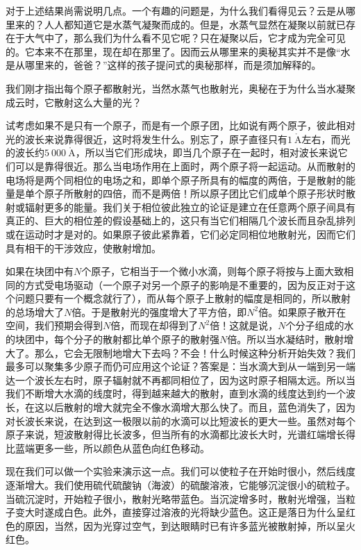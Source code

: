对于上述结果尚需说明几点。一个有趣的问题是，为什么我们看得见云？云是从哪里来的？人人都知道它是水蒸气凝聚而成的。但是，水蒸气显然在凝聚以前就已存在于大气中了，那么我们为什么看不见它呢？只在凝聚以后，它才成为完全可见的。它本来不在那里，现在却在那里了。因而云从哪里来的奥秘其实并不是像“水是从哪里来的，爸爸？”这样的孩子提问式的奥秘那样，而是须加解释的。

我们刚才指出每个原子都散射光，当然水蒸气也散射光，奥秘在于为什么当水凝聚成云时，它散射这么大量的光？

试考虑如果不是只有一个原子，而是有一个原子团，比如说有两个原子，彼此相对光的波长来说靠得很近，这时将发生什么。别忘了，原子直径只有$1~\mathring{\text{A}}$左右，而光的波长约$5~000~\mathring{\text{A}}$，所以当它们形成块，即当几个原子在一起时，相对波长来说它们可以是靠得很近。那么当电场作用在上面时，两个原子将一起运动。从而散射的电场将是两个同相位的电场之和，即单个原子所具有的幅度的两倍，于是散射的能量是单个原子所散射的四倍，而不是两倍！所以原子团比它们成单个原子形状时散射或辐射更多的能量。我们关于相位彼此独立的论证是建立在任意两个原子间具有真正的、巨大的相位差的假设基础上的，这只有当它们相隔几个波长而且杂乱排列或在运动时才是对的。如果原子彼此紧靠着，它们必定同相位地散射光，因而它们具有相干的干涉效应，使散射增加。

如果在块团中有$N$个原子，它相当于一个微小水滴，则每个原子将按与上面大致相同的方式受电场驱动（一个原子对另一个原子的影响是不重要的，因为反正对于这个问题只要有一个概念就行了），而从每个原子上散射的幅度是相同的，所以散射的总场增大了$N$倍。于是散射光的强度增大了平方倍，即$N^2$倍。如果原子散开在空间，我们预期会得到$N$倍，而现在却得到了$N^2$倍！这就是说，$N$个分子组成的水的块团中，每个分子的散射都比单个原子的散射强$N$倍。所以当水凝结时，散射增大了。那么，它会无限制地增大下去吗？不会！什么时候这种分析开始失效？我们最多可以聚集多少原子而仍可应用这个论证？答案是：当水滴大到从一端到另一端达一个波长左右时，原子辐射就不再都同相位了，因为这时原子相隔太远。所以当我们不断增大水滴的线度时，得到越来越大的散射，直到水滴的线度达到约一个波长，在这以后散射的增大就完全不像水滴增大那么快了。而且，蓝色消失了，因为对长波长来说，在达到这一极限以前的水滴可以比短波长的更大一些。虽然对每个原子来说，短波散射得比长波多，但当所有的水滴都比波长大时，光谱红端增长得比蓝端更多一些，所以颜色从蓝色向红色移动。

现在我们可以做一个实验来演示这一点。我们可以使粒子在开始时很小，然后线度逐渐增大。我们使用硫代硫酸钠（海波）的硫酸溶液，它能够沉淀很小的硫粒子。当硫沉淀时，开始粒子很小，散射光略带蓝色。当沉淀增多时，散射光增强，当粒子变大时遂成白色。此外，直接穿过溶液的光将缺少蓝色。这正是落日为什么呈红色的原因，当然，因为光穿过空气，到达眼睛时已有许多蓝光被散射掉，所以呈火红色。

